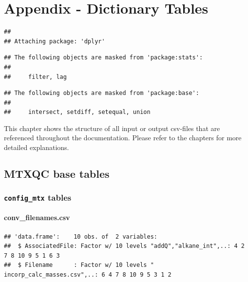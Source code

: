 \documentclass[]{book}
\theoremstyle{definition}
\theoremstyle{definition}
\theoremstyle{definition}
\theoremstyle{remark}
\begin{document}
\chapter{Appendix - Dictionary Tables}\label{tables}

\begin{verbatim}
## 
## Attaching package: 'dplyr'
\end{verbatim}

\begin{verbatim}
## The following objects are masked from 'package:stats':
## 
##     filter, lag
\end{verbatim}

\begin{verbatim}
## The following objects are masked from 'package:base':
## 
##     intersect, setdiff, setequal, union
\end{verbatim}

This chapter shows the structure of all input or output csv-files that
are referenced throughout the documentation. Please refer to the
chapters for more detailed explanations.

\section{MTXQC base tables}\label{mtxqc-base-tables}

\subsection{\texorpdfstring{\texttt{config\_mtx}
tables}{config\_mtx tables}}\label{config_mtx-tables}

\subsubsection{conv\_filenames.csv}\label{app:filenames}

\begin{verbatim}
## 'data.frame':    10 obs. of  2 variables:
##  $ AssociatedFile: Factor w/ 10 levels "addQ","alkane_int",..: 4 2 7 8 10 9 5 1 6 3
##  $ Filename      : Factor w/ 10 levels " incorp_calc_masses.csv",..: 6 4 7 8 10 9 5 3 1 2
\end{verbatim}

\end{document}
